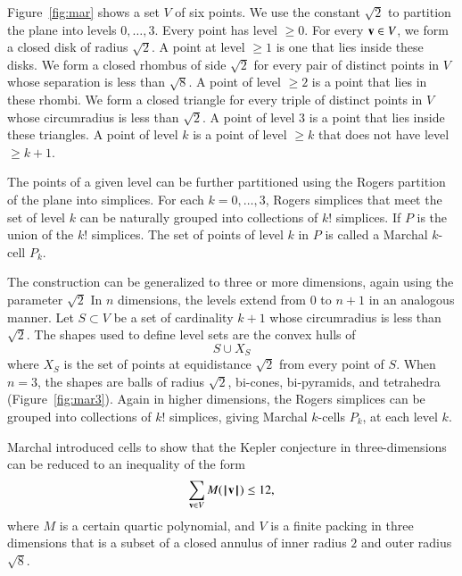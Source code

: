 \documentclass{llncs}
\begin{document}
Figure~\ref{fig:mar} shows a set $V$ of six points.  We use the
constant $\sqrt2$ to partition the plane into levels $0,\ldots,3$.
Every point has level $\ge 0$.
For every ${\mathbf v}\in V$, we form a closed disk of radius $\sqrt2$.  A
point at level $\ge1$ is one that lies inside these disks.  We form a
closed rhombus of side $\sqrt2$ for every pair of distinct points in
$V$ whose separation is less than $\sqrt8$.  A point of level $\ge2$
is a point that lies in these rhombi.  We form a closed triangle
for every triple of distinct points in $V$ whose circumradius is less
than $\sqrt2$.  A point of level $3$ is a point that lies inside
these triangles.  A point of level $k$
is a point of level $\ge k$ that does not have level $\ge k+1$.

The points of a given level can be further partitioned using the
Rogers partition of the plane into simplices.  For each
$k=0,\ldots,3$, Rogers simplices that meet the set of level $k$ can be naturally grouped
into collections of $k!$ simplices.  If $P$ is the union of the $k!$ simplices. The
set of points of level $k$ in $P$ is called a Marchal $k$-cell $P_k$.

The construction can be generalized to three or more dimensions,
again using the parameter $\sqrt2$   In $n$ dimensions, the levels extend
from $0$ to $n+1$ in an analogous manner.  Let $S\subset V$ be a set of
cardinality $k+1$ whose circumradius is less than $\sqrt2$.
The shapes used to define level sets are the convex hulls of
\[
S \cup X_S
\]
where $X_S$ is the set of points at equidistance $\sqrt2$ from every
point of $S$.  When $n=3$, the shapes are balls of radius $\sqrt2$,
bi-cones, bi-pyramids, and tetrahedra (Figure~\ref{fig:mar3}).  Again
in higher dimensions, the Rogers simplices can be grouped into
collections of $k!$ simplices, giving Marchal $k$-cells $P_k$, at each
level $k$.

\begin{remark}  Marchal introduced cells to show that the Kepler conjecture in three-dimensions
can
be reduced to an inequality of the form
\[
\sum_{{\mathbf v}\in V} M({{\hskip0.1em|\hskip-0.15em|\hskip0.1em}{\mathbf v}{\hskip0.1em|\hskip-0.15em|\hskip0.1em}}) \le 12,
\]
where $M$ is a certain quartic polynomial, and $V$ is a finite packing in three dimensions
that is a subset of a closed annulus of inner radius $2$ and outer
radius $\sqrt8$.  
\end{remark}
\end{document}
